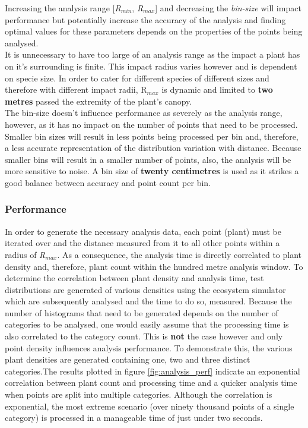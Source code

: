 Increasing the analysis range [\textit{R$_{min}$}, \textit{R$_{max}$}] and decreasing the \textit{bin-size} will impact performance but potentially increase the accuracy of the analysis and finding optimal values for these parameters depends on the properties of the points being analysed.\\
It is unnecessary to have too large of an analysis range as the impact a plant has on it's surrounding is finite. This impact radius varies however and is dependent on specie size. In order to cater for different species of different sizes and therefore with different impact radii, R$_{max}$ is dynamic and limited to \textbf{two metres} passed the extremity of the plant's canopy.\\
The bin-size doesn't influence performance as severely as the analysis range, however, as it has no impact on the number of points that need to be processed. Smaller bin sizes will result in less points being processed per bin and, therefore, a less accurate representation of the distribution variation with distance. Because smaller bins will result in a smaller number of points, also, the analysis will be more sensitive to noise. A bin size of \textbf{twenty centimetres} is used as it strikes a good balance between accuracy and point count per bin. \\

\subsubsection{Performance} \label{subsubsec:analysis_performance}

In order to generate the necessary analysis data, each point (plant) must be iterated over and the distance measured from it to all other points within a radius of \textit{R$_{max}$}. As a consequence, the analysis time is directly correlated to plant density and, therefore, plant count within the hundred metre analysis window. To determine the correlation between plant density and analysis time, test distributions are generated of various densities using the ecosystem simulator which are subsequently analysed and the time to do so, measured. Because the number of histograms that need to be generated depends on the number of categories to be analysed, one would easily assume that the processing time is also correlated to the category count. This is \textbf{not} the case however and only point density influences analysis performance. To demonstrate this, the various plant densities are generated containing one, two and three distinct categories.The results plotted in figure \ref{fig:analysis_perf} indicate an exponential correlation between plant count and processing time and a quicker analysis time when points are split into multiple categories. Although the correlation is exponential, the most extreme scenario (over ninety thousand points of a single category) is processed in a manageable time of just under two seconds. 

